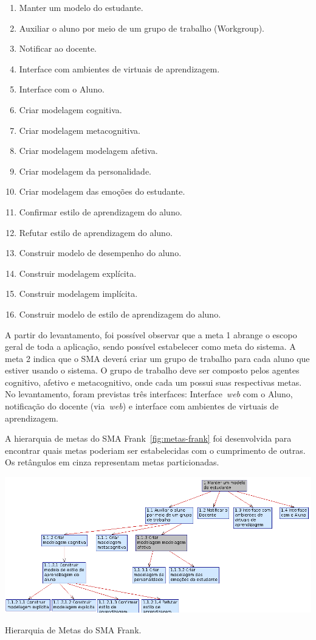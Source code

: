 \begin{enumerate}
	\item Manter um modelo do estudante.
	\item Auxiliar o aluno por meio de um grupo de trabalho (Workgroup).
	\item Notificar ao docente.
	\item Interface com ambientes de virtuais de aprendizagem.
	\item Interface com o Aluno.
	\item Criar modelagem cognitiva.
	\item Criar modelagem metacognitiva.
	\item Criar modelagem modelagem afetiva.
	\item Criar modelagem da personalidade.
	\item Criar modelagem das emoções do estudante.
	\item Confirmar estilo de aprendizagem do aluno.
	\item Refutar estilo de aprendizagem do aluno.
	\item Construir modelo de desempenho do aluno.
	\item Construir modelagem explícita.
	\item Construir modelagem implícita.
	\item Construir modelo de estilo de aprendizagem do aluno.
\end{enumerate}

A partir do levantamento, foi possível observar que a meta 1 abrange o escopo geral de toda a aplicação, sendo possível estabelecer como meta do sistema. A meta 2 indica que o SMA deverá criar um grupo de trabalho para cada aluno que estiver usando o sistema. O grupo de trabalho deve ser composto pelos agentes cognitivo, afetivo e metacognitivo, onde cada um possui suas respectivas metas. No levantamento, foram previstas três interfaces: Interface~\emph{web} com o Aluno, notificação do docente (via~\emph{web}) e interface com ambientes de virtuais de aprendizagem.

A hierarquia de metas do SMA Frank~\ref{fig:metas-frank} foi desenvolvida para encontrar quais metas poderiam ser estabelecidas com o cumprimento de outras. Os retângulos em cinza representam metas particionadas.

\begin{table}
	\centering
	\includegraphics[scale=0.7]{images/metas-frank.png}
	\caption{Hierarquia de Metas do SMA Frank.}
	\label{fig:metas-frank}
\end{table}

